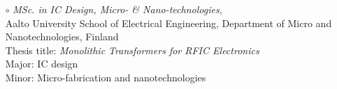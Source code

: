\documentclass[margin , 10pt]{res} %
\begin{document}
\begin{resume}
		\begin{itemize}
			\item[$\circ$] {\sl MSc. in IC Design, Micro- \& Nano-technologies}, \\
			Aalto University School of Electrical Engineering, Department of Micro and Nanotechnologies, Finland\\
			Thesis title: \emph{Monolithic Transformers for RFIC Electronics}\\
			Major: IC design\\
			Minor: Micro-fabrication and nanotechnologies %
		\end{itemize} \vspace{-3mm}

\end{resume}
\end{document}
